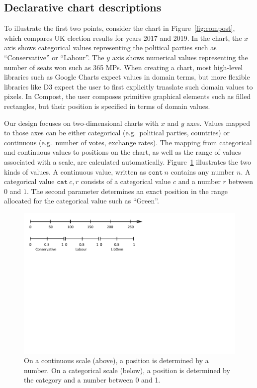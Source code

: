 \documentclass[fleqn,11pt]{report}
\theoremstyle{definition}
\begin{document}
\subsection{Declarative chart descriptions}

To illustrate the first two points, consider the chart in Figure~\ref{fig:compost}, which
compares UK election results for years 2017 and 2019. In the chart, the $x$ axis shows categorical
values representing the political parties such as ``Conservative'' or ``Labour''. The
$y$ axis shows numerical values representing the number of seats won such as 365 MPs.
When creating a chart, most high-level libraries such as Google Charts expect values in domain
terms, but more flexible libraries like D3 expect the user to first explicitly trnaslate
such domain values to pixels. In Compost, the user composes primitive graphical elements such
as filled rectangles, but their position is specified in terms of domain values.

Our design focuses on two-dimensional charts with $x$ and $y$ axes. Values mapped to those axes
can be either categorical (e.g.~political parties, countries) or continuous
(e.g.~number of votes, exchange rates). The mapping from categorical and continuous values
to positions on the chart, as well as the range of values associated with a scale,
are calculated automatically. Figure~\ref{fig:scales} illustrates the
two kinds of values. A continuous value, written as $\texttt{cont}~n$ contains any number $n$.
A categorical value $\texttt{cat}~c, r$ consists of a categorical value $c$ and a number $r$ between
$0$ and $1$. The second parameter determines an exact position in the range allocated for the
categorical value such as ``Green''.

\begin{figure}[t]
  \vspace{-1em}
  \centering\includegraphics[scale=0.95,trim=0cm 7cm 6cm 0cm,clip]{img/values.pdf}
  \caption{On a continuous scale (above), a position is determined by a number. On a
  categorical scale (below), a position is determined by the category and a number
  between 0 and 1.}
  \label{fig:scales}
\end{figure}
\end{document}

